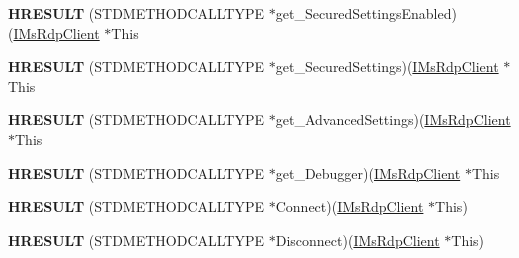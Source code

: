\begin{DoxyCompactItemize}
\item 
\mbox{\label{struct_m_s_t_s_c_lib_1_1_i_ms_rdp_client_vtbl_a5bccf6907b9715df9ded71e217abd48c}} 
{\bfseries H\+R\+E\+S\+U\+LT} (S\+T\+D\+M\+E\+T\+H\+O\+D\+C\+A\+L\+L\+T\+Y\+PE $\ast$get\+\_\+\+Secured\+Settings\+Enabled)(\hyperlink{interface_m_s_t_s_c_lib_1_1_i_ms_rdp_client}{I\+Ms\+Rdp\+Client} $\ast$This
\item 
\mbox{\label{struct_m_s_t_s_c_lib_1_1_i_ms_rdp_client_vtbl_a9705dd28b5c5f14f7b2543abb2e5fd77}} 
{\bfseries H\+R\+E\+S\+U\+LT} (S\+T\+D\+M\+E\+T\+H\+O\+D\+C\+A\+L\+L\+T\+Y\+PE $\ast$get\+\_\+\+Secured\+Settings)(\hyperlink{interface_m_s_t_s_c_lib_1_1_i_ms_rdp_client}{I\+Ms\+Rdp\+Client} $\ast$This
\item 
\mbox{\label{struct_m_s_t_s_c_lib_1_1_i_ms_rdp_client_vtbl_a13996058a54d1842f2d88579d6606f6a}} 
{\bfseries H\+R\+E\+S\+U\+LT} (S\+T\+D\+M\+E\+T\+H\+O\+D\+C\+A\+L\+L\+T\+Y\+PE $\ast$get\+\_\+\+Advanced\+Settings)(\hyperlink{interface_m_s_t_s_c_lib_1_1_i_ms_rdp_client}{I\+Ms\+Rdp\+Client} $\ast$This
\item 
\mbox{\label{struct_m_s_t_s_c_lib_1_1_i_ms_rdp_client_vtbl_acef3db4682184c32ab760bc1fdf03975}} 
{\bfseries H\+R\+E\+S\+U\+LT} (S\+T\+D\+M\+E\+T\+H\+O\+D\+C\+A\+L\+L\+T\+Y\+PE $\ast$get\+\_\+\+Debugger)(\hyperlink{interface_m_s_t_s_c_lib_1_1_i_ms_rdp_client}{I\+Ms\+Rdp\+Client} $\ast$This
\item 
\mbox{\label{struct_m_s_t_s_c_lib_1_1_i_ms_rdp_client_vtbl_a67b1d45103b6f2dc56453f8b14b0811b}} 
{\bfseries H\+R\+E\+S\+U\+LT} (S\+T\+D\+M\+E\+T\+H\+O\+D\+C\+A\+L\+L\+T\+Y\+PE $\ast$Connect)(\hyperlink{interface_m_s_t_s_c_lib_1_1_i_ms_rdp_client}{I\+Ms\+Rdp\+Client} $\ast$This)
\item 
\mbox{\label{struct_m_s_t_s_c_lib_1_1_i_ms_rdp_client_vtbl_aa786be62222b069d0182668e2ebe5ccf}} 
{\bfseries H\+R\+E\+S\+U\+LT} (S\+T\+D\+M\+E\+T\+H\+O\+D\+C\+A\+L\+L\+T\+Y\+PE $\ast$Disconnect)(\hyperlink{interface_m_s_t_s_c_lib_1_1_i_ms_rdp_client}{I\+Ms\+Rdp\+Client} $\ast$This)
\item 

\end{DoxyCompactItemize}

